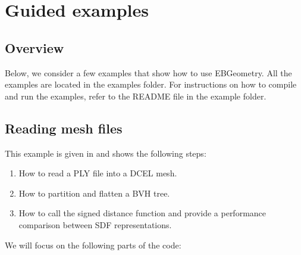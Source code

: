 \documentclass[letterpaper,10pt,english]{sphinxmanual}
\begin{document}
\chapter{Guided examples}
\label{\detokenize{index:guided-examples}}
\sphinxstepscope


\section{Overview}
\label{\detokenize{Examples:overview}}\label{\detokenize{Examples:chap-examples}}\label{\detokenize{Examples::doc}}
\sphinxAtStartPar
Below, we consider a few examples that show how to use EBGeometry.
All the examples are located in the examples folder.
For instructions on how to compile and run the examples, refer to the README file in the example folder.

\sphinxstepscope


\section{Reading mesh files}
\label{\detokenize{Example_Basic:reading-mesh-files}}\label{\detokenize{Example_Basic:chap-exampleply}}\label{\detokenize{Example_Basic::doc}}
\sphinxAtStartPar
This example is given in  and shows the following steps:
\begin{enumerate}
%
\item {} 
\sphinxAtStartPar
How to read a PLY file into a DCEL mesh.

\item {} 
\sphinxAtStartPar
How to partition and flatten a BVH tree.

\item {} 
\sphinxAtStartPar
How to call the signed distance function and provide a performance comparison between SDF representations.

\end{enumerate}

\sphinxAtStartPar
We will focus on the following parts of the code:
\end{document}
